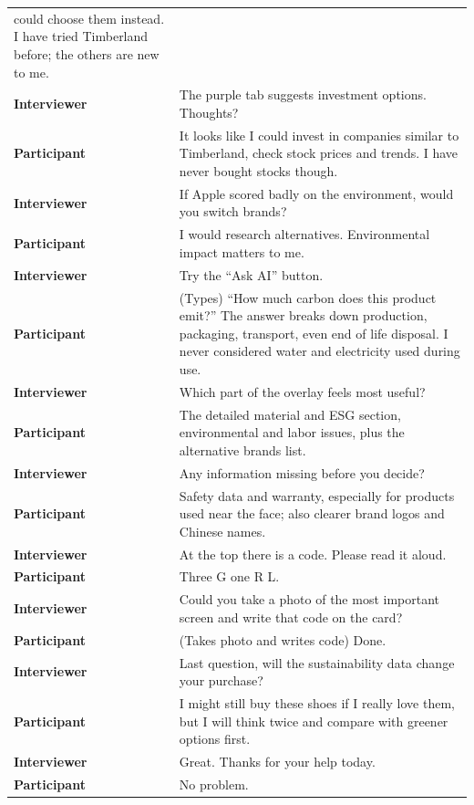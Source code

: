 \documentclass[
  12pt,
  letterpaper,
  DIV=11,
  numbers=noendperiod]{scrartcl}
\begin{document}
\begin{longtable}[]{@{}
  >{\raggedright\arraybackslash}p{}
  >{\raggedright\arraybackslash}p{}@{}}
could choose them instead. I have tried Timberland before; the others
are new to me. \\
\textbf{Interviewer} & The purple tab suggests investment options.
Thoughts? \\
\textbf{Participant} & It looks like I could invest in companies similar
to Timberland, check stock prices and trends. I have never bought stocks
though. \\
\textbf{Interviewer} & If Apple scored badly on the environment, would
you switch brands? \\
\textbf{Participant} & I would research alternatives. Environmental
impact matters to me. \\
\textbf{Interviewer} & Try the ``Ask AI'' button. \\
\textbf{Participant} & (Types) ``How much carbon does this product
emit?'' The answer breaks down production, packaging, transport, even
end of life disposal. I never considered water and electricity used
during use. \\
\textbf{Interviewer} & Which part of the overlay feels most useful? \\
\textbf{Participant} & The detailed material and ESG section,
environmental and labor issues, plus the alternative brands list. \\
\textbf{Interviewer} & Any information missing before you decide? \\
\textbf{Participant} & Safety data and warranty, especially for products
used near the face; also clearer brand logos and Chinese names. \\
\textbf{Interviewer} & At the top there is a code. Please read it
aloud. \\
\textbf{Participant} & Three G one R L. \\
\textbf{Interviewer} & Could you take a photo of the most important
screen and write that code on the card? \\
\textbf{Participant} & (Takes photo and writes code) Done. \\
\textbf{Interviewer} & Last question, will the sustainability data
change your purchase? \\
\textbf{Participant} & I might still buy these shoes if I really love
them, but I will think twice and compare with greener options first. \\
\textbf{Interviewer} & Great. Thanks for your help today. \\
\textbf{Participant} & No problem. \\
\end{longtable}
\end{document}
